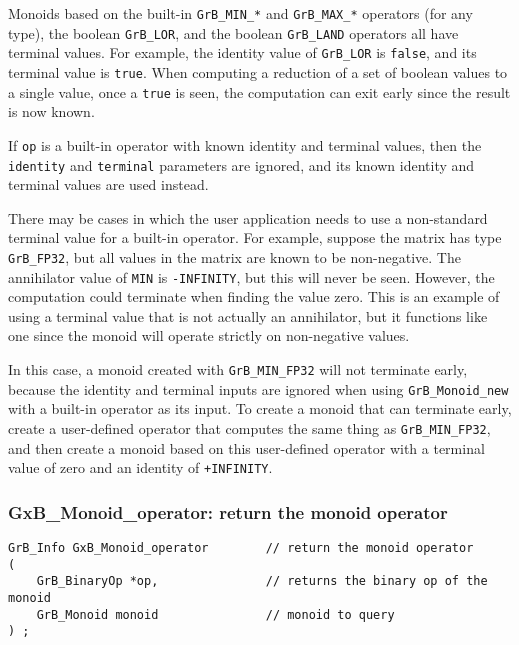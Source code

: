 \documentclass[12pt]{article}
\begin{document}
Monoids based on the built-in \verb'GrB_MIN_*' and \verb'GrB_MAX_*' operators
(for any type), the boolean \verb'GrB_LOR', and the boolean \verb'GrB_LAND'
operators all have terminal values.  For example, the identity value of
\verb'GrB_LOR' is \verb'false', and its terminal value is \verb'true'.  When
computing a reduction of a set of boolean values to a single value, once a
\verb'true' is seen, the computation can exit early since the result is now
known.

If \verb'op' is a built-in operator with known identity and terminal values,
then the \verb'identity' and \verb'terminal' parameters are ignored, and its
known identity and terminal values are used instead.

There may be cases in which the user application needs to use a non-standard
terminal value for a built-in operator.  For example, suppose the matrix has
type \verb'GrB_FP32', but all values in the matrix are known to be
non-negative.  The annihilator value of \verb'MIN' is \verb'-INFINITY', but
this will never be seen.  However, the computation could terminate when
finding the value zero.  This is an example of using a terminal value that is
not actually an annihilator, but it functions like one since the monoid will
operate strictly on non-negative values.

In this case, a monoid created with \verb'GrB_MIN_FP32' will not terminate
early, because the identity and terminal inputs are ignored when using
\verb'GrB_Monoid_new' with a built-in operator as its input.
To create a monoid that can terminate early, create a user-defined operator
that computes the same thing as \verb'GrB_MIN_FP32', and then create a monoid
based on this user-defined operator with a terminal value of zero and an
identity of \verb'+INFINITY'.

\subsubsection{{\sf GxB\_Monoid\_operator:} return the monoid operator}
\label{monoid_operator}

\begin{mdframed}[userdefinedwidth=6in]
{\footnotesize
\begin{verbatim}
GrB_Info GxB_Monoid_operator        // return the monoid operator
(
    GrB_BinaryOp *op,               // returns the binary op of the monoid
    GrB_Monoid monoid               // monoid to query
) ;
\end{verbatim}
} \end{mdframed}
\end{document}

